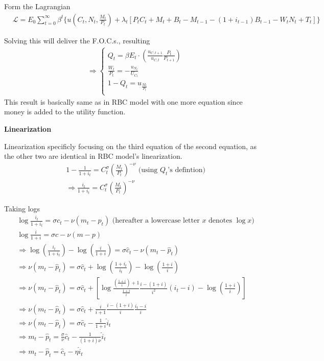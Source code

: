 \documentclass{article}
\begin{document}
Form the Lagrangian
\begin{align}
&\mathscr{L}=E_{0}\sum\limits_{t=0}^{\infty}\beta^{t} \{u(C_{t},N_{t},\frac{M_{t}}{P_{t}})+\lambda_{t}[P_{t}C_{t}+M_{t}+B_{t}-M_{t-1}-(1+i_{t-1})B_{t-1}-W_{t}N_{t}+T_{t}]\}
\end{align}

Solving this will deliver the F.O.C.s., resulting 
\begin{align}
&\Rightarrow \begin{cases} Q_{t}=\beta E_{t} \cdot (\frac{u_{C,t+1}}{u_{C,t}}\frac{P_{t}}{P_{t+1}}) \\
\frac{W_{t}}{P_{t}}=-\frac{u_{N_{t}}}{U_{C_t}} \\
1-Q_{t}=u_{\frac{M_{t}}{P_t}} \\
\end{cases}
\end{align}
This result is basically same as in RBC model with one more equation since money is added to the utility function.


\textbf{Linearization}

Linearization specificly focusing on the third equation of the second equation, as the other two are identical in RBC model's linearization.
\begin{align}
& 1-\frac{1}{1+i_{t}}=C_{t}^{\sigma}(\frac{M_{t}}{P_{t}})^{-\nu} \text{ (using $Q_t$'s defintion)}
\\&
\Rightarrow \frac{i_{t}}{1+i_{t}}=C_{t}^{\sigma}(\frac{M_{t}}{P_{t}})^{-\nu}
\end{align}

Taking logs
\begin{align}&
\log \frac{i_{t}}{1+i_{t}}=\sigma c_{t}-\nu (m_{t}-p_{t}) \text{ (hereafter a lowercase letter $x$ denotes $\log x$)}
\\&
\log \frac{i}{1+i}=\sigma c-\nu (m-p) 
\\&
\Rightarrow \log(\frac{i_{t}}{1+i_{t}})-\log(\frac{i}{1+i})=\sigma \hat c_{t}-\nu(m_{t}-\hat p_{t})
\\&
\Rightarrow \nu(m_{t}-\hat p_{t})=\sigma \hat c_{t}+\log (\frac{1+i_{t}}{i_{t}})-\log(\frac{1+i}{i})
\\&
\Rightarrow \nu(m_{t}-\hat p_{t})=\sigma \hat c_{t}+[\log \frac{(\frac{1+i}{i})+1}{\frac{1+i}{i}} \frac{i-(1+i)}{i^{2}}(i_{t}-i)-\log(\frac{1+i}{i})]
\\&
\Rightarrow \nu(m_{t}-\hat p_{t})=\sigma \hat c_{t}+ \frac{i}{i+1} \frac{i-(1+i)}{i} \frac{i_{t}-i}{i}
\\&
\Rightarrow \nu(m_{t}-\hat p_{t})=\sigma \hat c_{t}-\frac{1}{1+i}\hat i_{t}
\\&
\Rightarrow m_{t}-\hat p_{t}=\frac{\sigma}{\nu}\hat c_{t}-\frac{1}{(1+i)\nu}\hat i_{t}
\\&
\Rightarrow m_{t}-\hat p_{t}=\hat c_{t}-\eta \hat i_{t}
\end{align}
\end{document}

